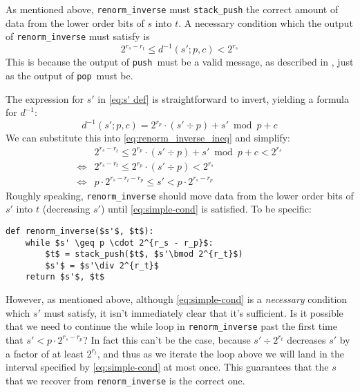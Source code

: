 \documentclass{article}
\newcommand{\push}{\texttt{push}}
\newcommand{\pop}{\texttt{pop}}
\begin{document}
As mentioned above, \texttt{renorm\_inverse} must \texttt{stack\_push} the
correct amount of data from the lower order bits of $s$ into $t$. A necessary
condition which the output of \texttt{renorm\_inverse} must satisfy is
\begin{equation}\label{eq:renorm_inverse_ineq}
  2^{r_s - r_t} \leq d^{-1}(s'; p, c) < 2^{r_s}
\end{equation}
This is because the output of \push\ must be a valid message, as described in
, just as the output of \pop\ must be.

The expression for $s'$ in \cref{eq:s' def} is straightforward to invert,
yielding a formula for
$d^{-1}$:
\begin{equation}
  d^{-1}(s'; p, c) = 2^{r_p} \cdot (s' \div p) + s' \bmod p + c
\end{equation}
We can substitute this into \cref{eq:renorm_inverse_ineq} and simplify:
\begin{align}
  &2^{r_s - r_t} \leq 2^{r_p} \cdot (s' \div p) + s' \bmod p + c < 2^{r_s}\\
  \iff&2^{r_s - r_t} \leq 2^{r_p} \cdot (s' \div p) < 2^{r_s}\\
  \iff&p\cdot2^{r_s - r_t - r_p}\leq s' < p\cdot 2^{r_s -
  r_p}\label{eq:simple-cond}
\end{align}
Roughly speaking, \texttt{renorm\_inverse} should move data from the lower
order bits of $s'$ into $t$ (decreasing $s'$) until \cref{eq:simple-cond} is
satisfied. To be specific:

\begin{lstlisting}
def renorm_inverse($s'$, $t$):
    while $s' \geq p \cdot 2^{r_s - r_p}$:
        $t$ = stack_push($t$, $s'\bmod 2^{r_t}$)
        $s'$ = $s'\div 2^{r_t}$
    return $s'$, $t$
\end{lstlisting}

However, as mentioned above, although \cref{eq:simple-cond} is a
\emph{necessary} condition which $s'$ must satisfy, it isn't immediately clear
that it's sufficient. Is it possible that we need to continue the while loop in
\texttt{renorm\_inverse} past the first time that $s'<p\cdot2^{r_s - r_p}$? In
fact this can't be the case, because $s'\div2^{r_t}$ decreases $s'$ by a factor
of at least $2^{r_t}$, and thus as we iterate the loop above we will land in
the interval specified by \cref{eq:simple-cond} at most once. This guarantees
that the $s$ that we recover from \texttt{renorm\_inverse} is the correct one.

\printbibliography
\end{document}
